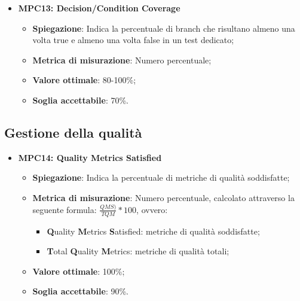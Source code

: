 \begin{itemize}
    \item \textbf{MPC13: Decision/Condition Coverage}
    \begin{itemize}
        \item \textbf{Spiegazione}: Indica la percentuale di branch che risultano almeno una volta true e almeno una volta false in un test dedicato;
        \item \textbf{Metrica di misurazione}: Numero percentuale;
        \item \textbf{Valore ottimale}: 80-100\%;
        \item \textbf{Soglia accettabile}: 70\%.
    \end{itemize}
\end{itemize}

\subsection{Gestione della qualità}
\begin{itemize}
    \item \textbf{MPC14: Quality Metrics Satisfied}
    \begin{itemize}
        \item \textbf{Spiegazione}: Indica la percentuale di metriche di qualità soddisfatte;
        \item \textbf{Metrica di misurazione}: Numero percentuale, calcolato attraverso la seguente formula: \textbf{$\frac{QMS)}{TQM}*100$}, ovvero:
            \begin{itemize}
                \item \textbf{Q}uality \textbf{M}etrics \textbf{S}atisfied: metriche di qualità soddisfatte;
                \item \textbf{T}otal \textbf{Q}uality \textbf{M}etrics: metriche di qualità totali;
            \end{itemize}
        \item \textbf{Valore ottimale}: 100\%;
        \item \textbf{Soglia accettabile}: 90\%.
    \end{itemize}
\end{itemize}

